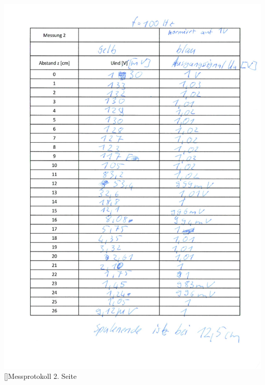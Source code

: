 \begin{center}
   		\includegraphics[scale=0.65]{Protokoll/2.jpg}
        []{Messprotokoll 2. Seite}
    	\pagebreak

\end{center}
